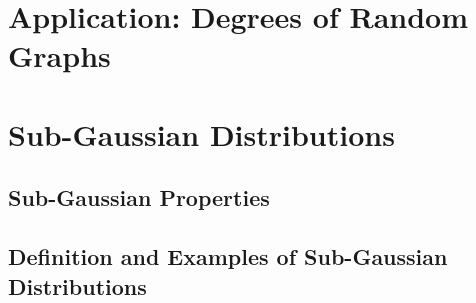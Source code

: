\documentclass{report}
\theoremstyle{definition}
\newenvironment{exercise}[1]{
  \renewcommand\theexerciseimpl{#1}
  \exerciseimpl
}{\endexerciseimpl}
\begin{document}
\section{Application: Degrees of Random Graphs}

\begin{exercise}{2.4.2}
\end{exercise}

\begin{exercise}{2.4.3}
\end{exercise}

\begin{exercise}{2.4.4}
\end{exercise}

\begin{exercise}{2.4.5}
\end{exercise}

\section{Sub-Gaussian Distributions}

\subsection{Sub-Gaussian Properties}

\begin{exercise}{2.5.1}
\end{exercise}

\begin{exercise}{2.5.4}
\end{exercise}

\begin{exercise}{2.5.5}
\end{exercise}

\subsection{Definition and Examples of Sub-Gaussian Distributions}

\begin{exercise}{2.5.7}
\end{exercise}

\begin{exercise}{2.5.9}
\end{exercise}

\begin{exercise}{2.5.10}
\end{exercise}

\begin{exercise}{2.5.11}
\end{exercise}
\end{document}
